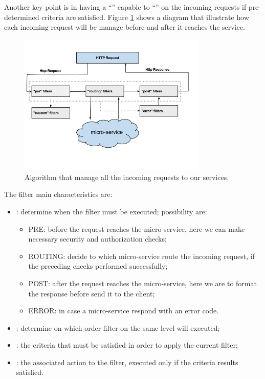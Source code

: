 Another key point is in having a ``'' capable to ``'' on the
incoming requests if pre-determined criteria are satisfied. Figure 
\ref{img:architecture-proposal-architecture-ingress} shows a diagram that illustrate how each incoming request
will be manage before and after it reaches the service.

\begin{figure}
	\centering{}
	\includegraphics[width=0.8\textwidth]{chapters/architecture/images/ingress-design.png}
	\caption[Request management by ingress]{Algorithm that manage all the incoming requests to our
		services.}
	\label{img:architecture-proposal-architecture-ingress}
\end{figure}

The filter main characteristics are:

\begin{itemize}
	\item{: determine when the filter must be executed; possibility are:}
	\begin{itemize}
		\item{PRE: before the request reaches the micro-service, here we can make necessary security
			and authorization checks;}
		\item{ROUTING: decide to which micro-service route the incoming request, if the preceding
			checks performed successfully;}
		\item{POST: after the request reaches the micro-service, here we are to format the response
			before send it to the client;}
		\item{ERROR: in case a micro-service respond with an error code.}
	\end{itemize}
	\item{: determine on which order filter on the same level will executed;}
	\item{: the criteria that must be satisfied in order to apply the current filter;}
	\item{: the associated action to the filter, executed only if the criteria results
		satisfied.}
\end{itemize}

